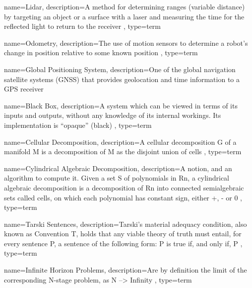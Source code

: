 {
    name=Lidar,
    description={A method for determining ranges (variable distance) by targeting an object or a surface with a laser and measuring the time for the reflected light to return to the receiver \cite{what_is_lidar}},
    type=term
}

{
    name=Odometry,
    description={The use of motion sensors to determine a robot's change in position relative to some known position \cite{robo-rats_locomotion_odometry}},
    type=term
}

{
    name=Global Positioning System,
    description={One of the global navigation satellite systems (GNSS) that provides geolocation and time information to a GPS receiver \cite{global_positioning_system}}
}

{
    name=Black Box,
    description={A system which can be viewed in terms of its inputs and outputs, without any knowledge of its internal workings. Its implementation is ``opaque'' (black) \cite{a_general_black_box_theory}},
    type=term
}

{
    name=Cellular Decomposition,
    description={A cellular decomposition G of a manifold M is a decomposition of M as the disjoint union of cells \cite{decompositions_of_manifolds}},
    type=term
}

{
    name=Cylindrical Algebraic Decomposition,
    description={A notion, and an algorithm to compute it. Given a set S of polynomials in Rn, a cylindrical algebraic decomposition is a decomposition of Rn into connected semialgebraic sets called cells, on which each polynomial has constant sign, either +, - or 0 \cite{cylindrical_algebraic_decompostion}},
    type=term
}

{
    name=Tarski Sentences,
    description={Tarski's material adequacy condition, also known as Convention T, holds that any viable theory of truth must entail, for every sentence P, a sentence of the following form: P is true if, and only if, P \cite{a_companion_to_the_philosophy_of_language}},
    type=term
}

{
    name=Infinite Horizon Problems,
    description={Are by definition the limit of the corresponding N-stage problem, as N --> Infinity \cite{infinite_horizon_problems}},
    type=term
}

